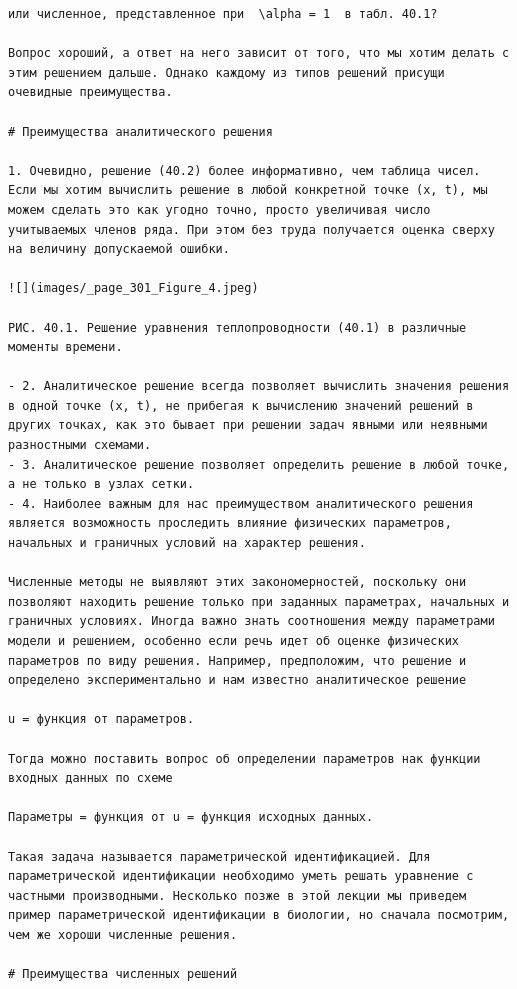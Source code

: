 \documentclass[
  ukrainian,
]{article}
\begin{document}
\begin{verbatim}
или численное, представленное при  \alpha = 1  в табл. 40.1?

Вопрос хороший, а ответ на него зависит от того, что мы хотим делать с этим решением дальше. Однако каждому из типов решений присущи очевидные преимущества.

# Преимущества аналитического решения

1. Очевидно, решение (40.2) более информативно, чем таблица чисел. Если мы хотим вычислить решение в любой конкретной точке (x, t), мы можем сделать это как угодно точно, просто увеличивая число учитываемых членов ряда. При этом без труда получается оценка сверху на величину допускаемой ошибки.

![](images/_page_301_Figure_4.jpeg)

РИС. 40.1. Решение уравнения теплопроводности (40.1) в различные моменты времени.

- 2. Аналитическое решение всегда позволяет вычислить значения решения в одной точке (x, t), не прибегая к вычислению значений решений в других точках, как это бывает при решении задач явными или неявными разностными схемами.
- 3. Аналитическое решение позволяет определить решение в любой точке, а не только в узлах сетки.
- 4. Наиболее важным для нас преимуществом аналитического решения является возможность проследить влияние физических параметров, начальных и граничных условий на характер решения.

Численные методы не выявляют этих закономерностей, поскольку они позволяют находить решение только при заданных параметрах, начальных и граничных условиях. Иногда важно знать соотношения между параметрами модели и решением, особенно если речь идет об оценке физических параметров по виду решения. Например, предположим, что решение и определено экспериментально и нам известно аналитическое решение

u = функция от параметров.

Тогда можно поставить вопрос об определении параметров нак функции входных данных по схеме

Параметры = функция от u = функция исходных данных.

Такая задача называется параметрической идентификацией. Для параметрической идентификации необходимо уметь решать уравнение с частными производными. Несколько позже в этой лекции мы приведем пример параметрической идентификации в биологии, но сначала посмотрим, чем же хороши численные решения.

# Преимущества численных решений


\end{verbatim}
\end{document}
